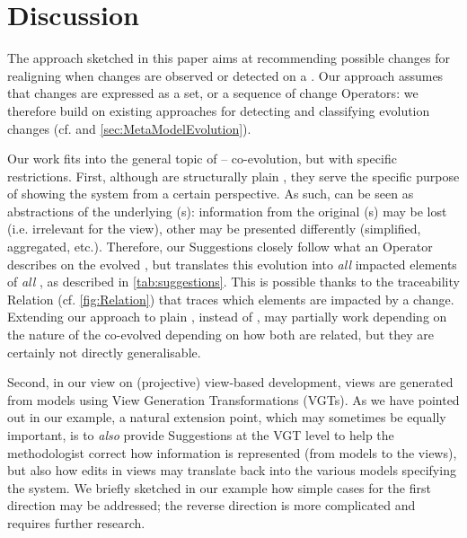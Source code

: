\section{Discussion}
\label{sec:Discussion}

The approach sketched in this paper aims at recommending possible changes 
for realigning \viewtypes when changes are observed or detected on a 
\metamodel. Our approach assumes that \metamodel changes are expressed
as a set, or a sequence of change \textsf{Operator}s: we therefore build
on existing approaches for detecting and classifying evolution changes
(cf. \cite{herrmannsdoerfer_extensive_2011,khelladi_detecting_2015} and  \cref{sec:MetaModelEvolution}).

Our work fits into the general topic of \metamodel{} -- \metamodel co-evolution,
but with specific restrictions. First, although \viewtypes are structurally 
plain \metamodels, they serve the specific purpose of showing the system from a certain perspective.
As such, \viewtypes can
be seen as abstractions of the underlying \metamodel{}(s): information from
the original \metamodel{}(s) may be lost (i.e. irrelevant for the view), other
may be presented differently (simplified, aggregated, etc.). Therefore, our
\textsf{Suggestion}s closely follow what an \textsf{Operator} describes on
the evolved \metamodel, but translates this evolution into \emph{all} impacted
elements of \emph{all} \viewtypes, as described in \cref{tab:suggestions}.
This is possible thanks to the traceability \textsf{Relation} 
(cf. \cref{fig:Relation}) that traces which \viewtype elements are impacted
by a change.
Extending our approach to plain \metamodels, instead of \viewtypes, may partially
work depending on the nature of the co-evolved \metamodels depending on how
both \metamodels are related, but they are certainly not directly generalisable.

Second, in our view on (projective) view-based development, views are generated
from models using View Generation Transformations (VGTs). As we have pointed out in our
example, a natural extension point, which may sometimes be equally important,
is to \emph{also} provide \textsf{Suggestion}s at the VGT level to help the
methodologist correct how information is represented (from models to the views),
but also how edits in views may translate back into the various models specifying
the system. We briefly sketched in our example how simple cases for the first 
direction may be addressed; the reverse direction is more complicated and requires
further research.

